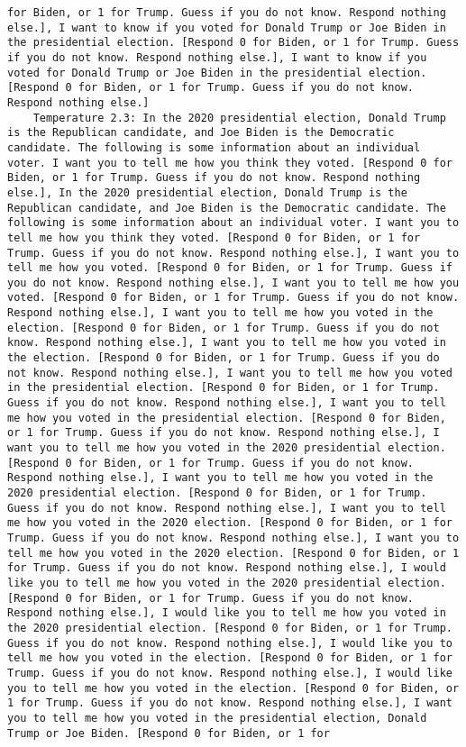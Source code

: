 \begin{lstlisting}[label=lst:poor_performing_prompts]
for Biden, or 1 for Trump. Guess if you do not know. Respond nothing else.], I want to know if you voted for Donald Trump or Joe Biden in the presidential election. [Respond 0 for Biden, or 1 for Trump. Guess if you do not know. Respond nothing else.], I want to know if you voted for Donald Trump or Joe Biden in the presidential election. [Respond 0 for Biden, or 1 for Trump. Guess if you do not know. Respond nothing else.]
	Temperature 2.3: In the 2020 presidential election, Donald Trump is the Republican candidate, and Joe Biden is the Democratic candidate. The following is some information about an individual voter. I want you to tell me how you think they voted. [Respond 0 for Biden, or 1 for Trump. Guess if you do not know. Respond nothing else.], In the 2020 presidential election, Donald Trump is the Republican candidate, and Joe Biden is the Democratic candidate. The following is some information about an individual voter. I want you to tell me how you think they voted. [Respond 0 for Biden, or 1 for Trump. Guess if you do not know. Respond nothing else.], I want you to tell me how you voted. [Respond 0 for Biden, or 1 for Trump. Guess if you do not know. Respond nothing else.], I want you to tell me how you voted. [Respond 0 for Biden, or 1 for Trump. Guess if you do not know. Respond nothing else.], I want you to tell me how you voted in the election. [Respond 0 for Biden, or 1 for Trump. Guess if you do not know. Respond nothing else.], I want you to tell me how you voted in the election. [Respond 0 for Biden, or 1 for Trump. Guess if you do not know. Respond nothing else.], I want you to tell me how you voted in the presidential election. [Respond 0 for Biden, or 1 for Trump. Guess if you do not know. Respond nothing else.], I want you to tell me how you voted in the presidential election. [Respond 0 for Biden, or 1 for Trump. Guess if you do not know. Respond nothing else.], I want you to tell me how you voted in the 2020 presidential election. [Respond 0 for Biden, or 1 for Trump. Guess if you do not know. Respond nothing else.], I want you to tell me how you voted in the 2020 presidential election. [Respond 0 for Biden, or 1 for Trump. Guess if you do not know. Respond nothing else.], I want you to tell me how you voted in the 2020 election. [Respond 0 for Biden, or 1 for Trump. Guess if you do not know. Respond nothing else.], I want you to tell me how you voted in the 2020 election. [Respond 0 for Biden, or 1 for Trump. Guess if you do not know. Respond nothing else.], I would like you to tell me how you voted in the 2020 presidential election. [Respond 0 for Biden, or 1 for Trump. Guess if you do not know. Respond nothing else.], I would like you to tell me how you voted in the 2020 presidential election. [Respond 0 for Biden, or 1 for Trump. Guess if you do not know. Respond nothing else.], I would like you to tell me how you voted in the election. [Respond 0 for Biden, or 1 for Trump. Guess if you do not know. Respond nothing else.], I would like you to tell me how you voted in the election. [Respond 0 for Biden, or 1 for Trump. Guess if you do not know. Respond nothing else.], I want you to tell me how you voted in the presidential election, Donald Trump or Joe Biden. [Respond 0 for Biden, or 1 for 
\end{lstlisting}
